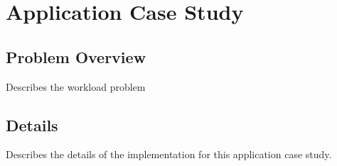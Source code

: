 \section{Application Case Study}
\label{casestudy}

\subsection{Problem Overview}

Describes the workload problem

\subsection{Details}

Describes the details of the implementation for this application case study. 